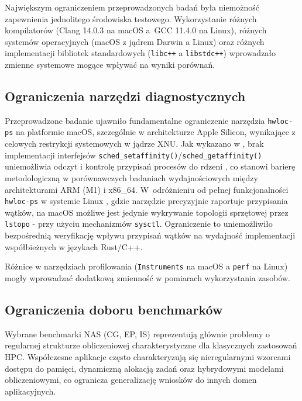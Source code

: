 Największym ograniczeniem przeprowadzonych badań była niemożność zapewnienia jednolitego środowiska testowego. Wykorzystanie różnych kompilatorów (Clang 14.0.3 na macOS a~GCC 11.4.0 na Linux), różnych systemów operacyjnych (macOS z jądrem Darwin a Linux) oraz różnych implementacji bibliotek standardowych (\texttt{libc++} a \texttt{libstdc++}) wprowadzało zmienne systemowe mogące wpływać na wyniki porównań.

\subsection{Ograniczenia narzędzi diagnostycznych}

Przeprowadzone badanie ujawniło fundamentalne ograniczenie narzędzia \texttt{hwloc-ps} na platformie macOS, szczególnie w architekturze Apple Silicon, wynikające z celowych restrykcji systemowych w jądrze XNU. Jak wykazano w \cite{HWLOC555}, brak implementacji interfejsów \texttt{sched\_setaffinity()}/\texttt{sched\_getaffinity()} uniemożliwia odczyt i kontrolę przypisań procesów do rdzeni , co stanowi barierę metodologiczną w porównawczych badaniach wydajnościowych między architekturami ARM (M1) i x86\_64. W~odróżnieniu od pełnej funkcjonalności \texttt{hwloc-ps} w systemie Linux \cite{hwlocHardwareLocality}, gdzie narzędzie precyzyjnie raportuje przypisania wątków, na macOS możliwe jest jedynie wykrywanie topologii sprzętowej przez \texttt{lstopo} - przy użyciu mechanizmów \texttt{sysctl}. Ograniczenie to uniemożliwiło bezpośrednią weryfikację wpływu przypisań wątków  na wydajność implementacji współbieżnych w językach Rust/C++.

Różnice w narzędziach profilowania (\texttt{Instruments} na macOS a \texttt{perf} na Linux) mogły wprowadzać dodatkową zmienność w pomiarach wykorzystania zasobów.

\subsection{Ograniczenia doboru benchmarków}

Wybrane benchmarki NAS (CG, EP, IS) reprezentują głównie problemy o regularnej strukturze obliczeniowej charakterystyczne dla klasycznych zastosowań HPC. Współczesne aplikacje często charakteryzują się nieregularnymi wzorcami dostępu do pamięci, dynamiczną alokacją zadań oraz hybrydowymi modelami obliczeniowymi, co ogranicza generalizację wniosków do innych domen aplikacyjnych.

